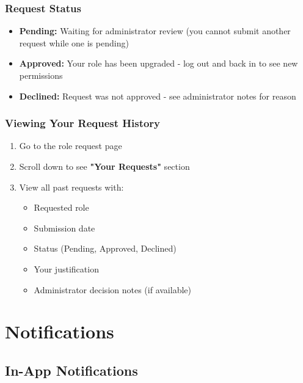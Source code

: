 \documentclass[12pt,a4paper]{article}
\begin{document}
\subsubsection{Request Status}
\begin{itemize}[leftmargin=*]
    \item \textbf{Pending:} Waiting for administrator review (you cannot submit another request while one is pending)
    \item \textbf{Approved:} Your role has been upgraded - log out and back in to see new permissions
    \item \textbf{Declined:} Request was not approved - see administrator notes for reason
\end{itemize}

\newpage

\subsubsection{Viewing Your Request History}
\begin{enumerate}[leftmargin=*]
    \item Go to the role request page
    \item Scroll down to see \textbf{"Your Requests"} section
    \item View all past requests with:
        \begin{itemize}
            \item Requested role
            \item Submission date
            \item Status (Pending, Approved, Declined)
            \item Your justification
            \item Administrator decision notes (if available)
        \end{itemize}
\end{enumerate}

\section{Notifications}

\subsection{In-App Notifications}
\end{document}
